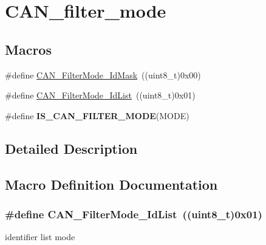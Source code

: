 \hypertarget{group___c_a_n__filter__mode}{}\section{C\+A\+N\+\_\+filter\+\_\+mode}
\label{group___c_a_n__filter__mode}
\subsection*{Macros}
\begin{DoxyCompactItemize}
\item 
\#define \hyperlink{group___c_a_n__filter__mode_ga8136e518fb31fd91079e4c7c4c19c94b}{C\+A\+N\+\_\+\+Filter\+Mode\+\_\+\+Id\+Mask}~((uint8\+\_\+t)0x00)
\item 
\#define \hyperlink{group___c_a_n__filter__mode_ga91e9144f71b15ac345ee89314711c158}{C\+A\+N\+\_\+\+Filter\+Mode\+\_\+\+Id\+List}~((uint8\+\_\+t)0x01)
\item 
\#define {\bfseries I\+S\+\_\+\+C\+A\+N\+\_\+\+F\+I\+L\+T\+E\+R\+\_\+\+M\+O\+D\+E}(M\+O\+D\+E)
\end{DoxyCompactItemize}


\subsection{Detailed Description}


\subsection{Macro Definition Documentation}
\hypertarget{group___c_a_n__filter__mode_ga91e9144f71b15ac345ee89314711c158}{}
\subsubsection[{C\+A\+N\+\_\+\+Filter\+Mode\+\_\+\+Id\+List}]{\setlength{\rightskip}{0pt plus 5cm}\#define C\+A\+N\+\_\+\+Filter\+Mode\+\_\+\+Id\+List~((uint8\+\_\+t)0x01)}\label{group___c_a_n__filter__mode_ga91e9144f71b15ac345ee89314711c158}
identifier list mode \hypertarget{group___c_a_n__filter__mode_ga8136e518fb31fd91079e4c7c4c19c94b}{}
